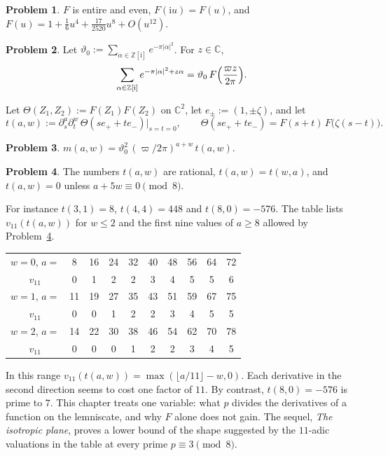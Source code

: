 \documentclass[reqno]{amsart}
\newcounter{chap}
\theoremstyle{definition}
\newtheorem{problem}{Problem}[section]
\theoremstyle{plain}
\newcommand{\Z}{\mathbb{Z}}
\newcommand{\C}{\mathbb{C}}
\newcommand{\ii}{\mathrm{i}}
\begin{document}
\begin{problem}\label{pr:F}
\(F\) is entire and even, \(F(\ii u) = F(u)\), and \(F(u) = 1 + \tfrac16 u^4 + \tfrac{17}{2520} u^8 + O(u^{12})\).
\end{problem}

\begin{problem}\label{pr:gauss}
Let \(\vartheta_0 := \sum_{\alpha \in \Z[\ii]} e^{-\pi \lvert \alpha \rvert^2}\).  For \(z \in \C\),
\[
  \sum_{\alpha \in \Z[\ii]} e^{-\pi\lvert\alpha\rvert^2 + z\alpha} = \vartheta_0\, F\Bigl(\frac{\varpi z}{2\pi}\Bigr).
\]
\end{problem}

Let \(\Theta(Z_1, Z_2) := F(Z_1) F(Z_2)\) on \(\C^2\), let \(e_\pm := (1, \pm\zeta)\), and let
\[
  t(a,w) := \partial_s^a \partial_t^w \, \Theta(s e_+ + t e_-) \big|_{s = t = 0} ,
  \qquad
  \Theta(s e_+ + t e_-) = F(s+t)\, F\bigl(\zeta(s-t)\bigr).
\]

\begin{problem}\label{pr:moments}
\(m(a,w) = \vartheta_0^2\, (\varpi/2\pi)^{a+w}\, t(a,w)\).
\end{problem}

\begin{problem}\label{pr:t-sym}
The numbers \(t(a,w)\) are rational, \(t(a,w) = t(w,a)\), and \(t(a,w) = 0\) unless \(a + 5w \equiv 0 \pmod 8\).
\end{problem}

For instance \(t(3,1) = 8\), \(t(4,4) = 448\) and \(t(8,0) = -576\).  The table lists \(v_{11}(t(a,w))\) for \(w \le 2\) and the first nine values of \(a \ge 8\) allowed by Problem~\ref{pr:t-sym}.
\begin{center}
\begin{tabular}{c|ccccccccc}
\(w = 0\), \(a =\) & 8 & 16 & 24 & 32 & 40 & 48 & 56 & 64 & 72 \\
\(v_{11}\) & 0 & 1 & 2 & 2 & 3 & 4 & 5 & 5 & 6 \\
\hline
\(w = 1\), \(a =\) & 11 & 19 & 27 & 35 & 43 & 51 & 59 & 67 & 75 \\
\(v_{11}\) & 0 & 0 & 1 & 2 & 2 & 3 & 4 & 5 & 5 \\
\hline
\(w = 2\), \(a =\) & 14 & 22 & 30 & 38 & 46 & 54 & 62 & 70 & 78 \\
\(v_{11}\) & 0 & 0 & 0 & 1 & 2 & 2 & 3 & 4 & 5
\end{tabular}
\end{center}
In this range \(v_{11}(t(a,w)) = \max(\lfloor a/11 \rfloor - w, 0)\).  Each derivative in the second direction seems to cost one factor of \(11\).  By contrast, \(t(8,0) = -576\) is prime to \(7\).  This chapter treats one variable: what \(p\) divides the derivatives of a function on the lemniscate, and why \(F\) alone does not gain.  The sequel, \emph{The isotropic plane}, proves a lower bound of the shape suggested by the \(11\)-adic valuations in the table at every prime \(p \equiv 3 \pmod 8\).
\end{document}
